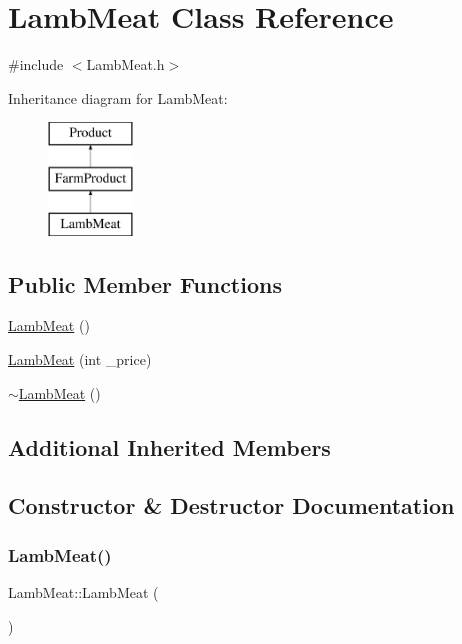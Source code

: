 \hypertarget{classLambMeat}{}\section{Lamb\+Meat Class Reference}
\label{classLambMeat}


{\ttfamily \#include $<$Lamb\+Meat.\+h$>$}

Inheritance diagram for Lamb\+Meat\+:\begin{figure}[H]
\begin{center}
\leavevmode
\includegraphics[height=3.000000cm]{classLambMeat}
\end{center}
\end{figure}
\subsection*{Public Member Functions}
\begin{DoxyCompactItemize}
\item 
\mbox{\hyperlink{classLambMeat_a70891d643b77d1ff2ee0427979acb012}{Lamb\+Meat}} ()
\item 
\mbox{\hyperlink{classLambMeat_a0f6b0c1fd6058519518337b6df8dea1b}{Lamb\+Meat}} (int \+\_\+price)
\item 
\mbox{\hyperlink{classLambMeat_a92d05cb893a6d325c83084ddc1d8a6da}{$\sim$\+Lamb\+Meat}} ()
\end{DoxyCompactItemize}
\subsection*{Additional Inherited Members}


\subsection{Constructor \& Destructor Documentation}
\mbox{\label{classLambMeat_a70891d643b77d1ff2ee0427979acb012}} 
\subsubsection{\texorpdfstring{LambMeat()}{LambMeat()}\hspace{0.1cm}{\footnotesize\ttfamily [1/2]}}
{\footnotesize\ttfamily Lamb\+Meat\+::\+Lamb\+Meat (\begin{DoxyParamCaption}{ }\end{DoxyParamCaption})}

